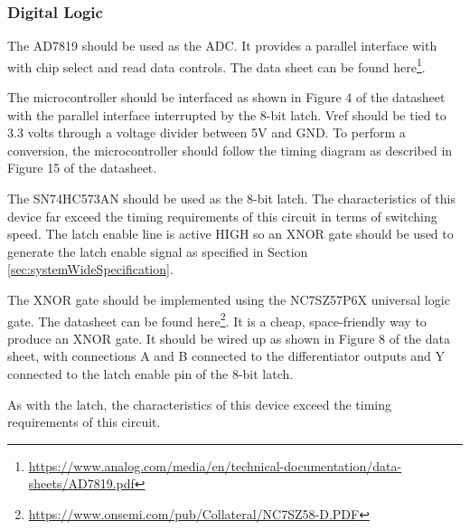 \subsubsection{Digital Logic}
The AD7819 should be used as the ADC.
It provides a parallel interface with with chip select and read data controls. 
The data sheet can be found here\footnote{\url{https://www.analog.com/media/en/technical-documentation/data-sheets/AD7819.pdf}}.

The microcontroller should be interfaced as shown in Figure 4 of the datasheet with the parallel interface interrupted by the 8-bit latch.
Vref should be tied to 3.3 volts through a voltage divider between 5V and GND. 
To perform a conversion, the microcontroller should follow the timing diagram as described in Figure 15 of the datasheet. 

The SN74HC573AN should be used as the 8-bit latch. 
The characteristics of this device far exceed the timing requirements of this circuit in terms of switching speed. 
The latch enable line is active HIGH so an XNOR gate should be used to generate the latch enable signal as specified in Section \ref{sec:systemWideSpecification}.

The XNOR gate should be implemented using the NC7SZ57P6X universal logic gate. 
The datasheet can be found here\footnote{\url{https://www.onsemi.com/pub/Collateral/NC7SZ58-D.PDF}}.
It is a cheap, space-friendly way to produce an XNOR gate.
It should be wired up as shown in Figure 8 of the data sheet, with connections A and B connected to the differentiator outputs and Y connected to the latch enable pin of the 8-bit latch. 

As with the latch, the characteristics of this device exceed the timing requirements of this circuit.
